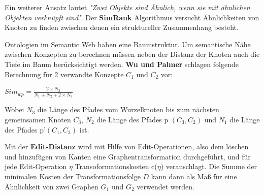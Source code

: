 Ein weiterer Ansatz lautet \textit{"Zwei Objekte sind Ähnlich, wenn sie mit ähnlichen Objekten verknüpft sind"}. Der \textbf{SimRank} \cite{Jeh:2002:SMS:775047.775126} Algorithmus versucht Ähnlichkeiten von Knoten zu finden zwischen denen ein struktureller Zusammenhang besteht. 
\vspace{1em}

Ontologien im Semantic Web haben eine Baumstruktur. Um semantische Nähe zwischen Konzepten zu berechnen müssen neben der Distanz der Knoten auch die Tiefe im Baum berücksichtigt werden. \textbf{Wu und Palmer} \cite{Wu:1994:VSL:981732.981751} schlagen folgende Berechnung für 2 verwandte Konzepte $C_{1}$ und $C_{2}$ vor:\par

\begin{center}
	$Sim_{wp}=\frac{2 \times N_{3}}{N_{1} + N_{2} + 2 \times N_{3}}$
\end{center}

Wobei $N_{3}$ die Länge des Pfades vom Wurzelknoten bis zum nächsten gemeinsamen Knoten $C_{3}$, $N_{2}$ die Länge des Pfades p $(C_{3},C_{2})$ und $N_{1}$ die Länge des Pfades p'$(C_{1},C_{3})$ ist.
\vspace{1em}

Mit der \textbf{Edit-Distanz} \cite{Krumke2012} wird mit Hilfe von Edit-Operationen, also dem löschen und hinzufügen von Kanten eine Graphentransformation durchgeführt, und für jede Edit-Operation $\eta$ Transoformationskosten c($\eta$) veranschlagt. Die Summe der minimalen Kosten der Transformationsfolge $D$ kann dann als Maß für eine Ähnlichkeit von zwei Graphen $G_{1}$ und $G_{2}$ verwendet werden.